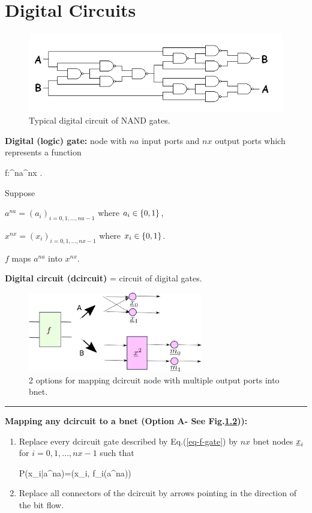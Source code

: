 \chapter{Digital Circuits}

\begin{figure}[h!]
\centering
\includegraphics[width=6in]{d-ckt/d-ckt.png}
\caption{Typical digital circuit
of NAND gates.}
\label{fig-d-ckt}
\end{figure}

{\bf Digital (logic) gate:} node with
$na$ input ports and $nx$ output ports
which represents a function

\beq
f:\bool^{na}\rarrow \bool^{nx}
\;.
\label{eq-f-gate}
\eeq

Suppose

$a^{na}=(a_i)_{i=0, 1,\dots, na-1}$ 
where $a_i\in \{0,1\}$,

$x^{nx}=(x_i)_{i=0, 1,\dots, nx-1}$ 
where $x_i\in \{0,1\}$. 

$f$ maps $a^{na}$ into $x^{nx}$.

{\bf Digital circuit (dcircuit)} = circuit of digital gates.

\begin{figure}[h!]
\centering
\includegraphics[width=3in]{d-ckt/d-ckt-2ops.png}
\caption{2 options
for mapping dcircuit node with
multiple output ports into bnet.}
\label{fig-d-ckt-2ops}
\end{figure}

\hrule\noindent
{\bf Mapping any
dcircuit to a bnet (Option A-
See Fig.\ref{fig-d-ckt-2ops})):}
\begin{enumerate}
\item
Replace every dcircuit  gate 
described by Eq.(\ref{eq-f-gate})
by
$nx$ bnet nodes ${\underline{x}}_i$
for $i=0, 1, \ldots, nx-1$
such that

\beq\color{blue}
P(x_i|a^{na})=\delta(x_i, f_i(a^{na}))
\eeq
\item
Replace
all connectors of the dcircuit
by arrows 
pointing in the direction
of the bit flow.

\end{enumerate}

